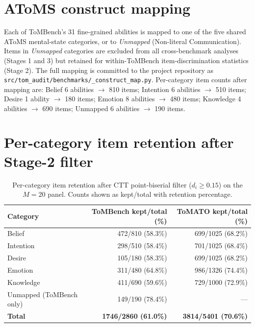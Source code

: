 \documentclass{article} %
\begin{document}



\appendix

\section{AToMS construct mapping}
\label{app:atoms-map}

Each of ToMBench's 31 fine-grained abilities is mapped to one of the five shared AToMS \citep{beaudoin2020atoms} mental-state categories, or to \emph{Unmapped} (Non-literal Communication). Items in \emph{Unmapped} categories are excluded from all cross-benchmark analyses (Stages 1 and 3) but retained for within-ToMBench item-discrimination statistics (Stage 2). The full mapping is committed to the project repository as \texttt{src/tom\_audit/benchmarks/\_construct\_map.py}. Per-category item counts after mapping are: Belief 6 abilities $\to$ 810 items; Intention 6 abilities $\to$ 510 items; Desire 1 ability $\to$ 180 items; Emotion 8 abilities $\to$ 480 items; Knowledge 4 abilities $\to$ 690 items; Unmapped 6 abilities $\to$ 190 items.

\section{Per-category item retention after Stage-2 filter}
\label{app:retention}

\begin{table}[h]
\centering
\small
\caption{Per-category item retention after CTT point-biserial filter ($d_i \ge 0.15$) on the $M=20$ panel. Counts shown as kept/total with retention percentage.}
\label{tab:retention}
\begin{tabular}{lrr}
\toprule
Category & ToMBench kept/total (\%) & ToMATO kept/total (\%) \\
\midrule
Belief & 472/810 (58.3\%) & 699/1025 (68.2\%) \\
Intention & 298/510 (58.4\%) & 701/1025 (68.4\%) \\
Desire & 105/180 (58.3\%) & 699/1025 (68.2\%) \\
Emotion & 311/480 (64.8\%) & 986/1326 (74.4\%) \\
Knowledge & 411/690 (59.6\%) & 729/1000 (72.9\%) \\
Unmapped (ToMBench only) & 149/190 (78.4\%) & --- \\
\midrule
\textbf{Total} & \textbf{1746/2860 (61.0\%)} & \textbf{3814/5401 (70.6\%)} \\
\bottomrule
\end{tabular}
\end{table}
\end{document}
